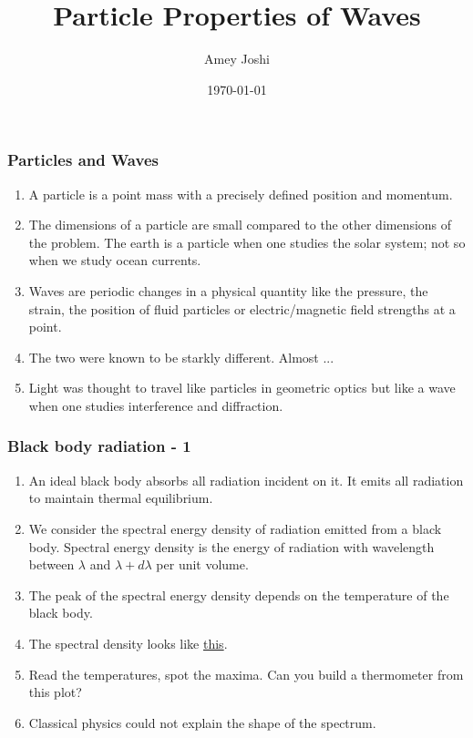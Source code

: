 \documentclass{beamer}
\title{Particle Properties of Waves}
\author{Amey Joshi}
\date{\today}
\begin{document}
\begin{frame}
\titlepage
\end{frame}

\begin{frame}
\frametitle{Particles and Waves}
\begin{enumerate}
\item A particle is a point mass with a precisely defined position and momentum.
\item The dimensions of a particle are small compared to the other dimensions of
the problem. The earth is a particle when one studies the solar system; not so
when we study ocean currents.
\item Waves are periodic changes in a physical quantity like the pressure, the
strain, the position of fluid particles or electric/magnetic field strengths
at a point.
\item The two were known to be starkly different. Almost ...
\item Light was thought to travel like particles in geometric optics but like
a wave when one studies interference and diffraction.
\end{enumerate}
\end{frame}

\begin{frame}
\frametitle{Black body radiation - 1}
\begin{enumerate}
\item An ideal black body absorbs all radiation incident on it. It emits all
radiation to maintain thermal equilibrium.
\item We consider the spectral energy density of radiation emitted from a black
body. Spectral energy density is the energy of radiation with wavelength between
$\lambda$ and $\lambda + d\lambda$ per unit volume.
\item The peak of the spectral energy density depends on the temperature of the
black body. 
\item The spectral density looks like 
\href{https://www.britannica.com/science/blackbody}{this}.
\item Read the temperatures, spot the maxima. Can you build a thermometer from
 this plot?
\item Classical physics could not explain the shape of the spectrum.
\end{enumerate}
\end{frame}
\end{document}
